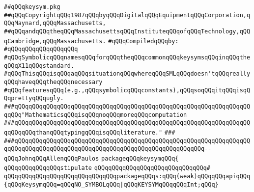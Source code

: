 \label{src/lib/x-kit/xclient/src/window/keysym.pkg}
\verb|##qQQqkeysym.pkg|\newline
\verb|##qQQqCopyrightqQQq1987qQQqbyqQQqDigitalqQQqEquipmentqQQqCorporation,qQQqMaynard,qQQqMassachusetts,|\newline
\verb|##qQQqandqQQqtheqQQqMassachusettsqQQqInstituteqQQqofqQQqTechnology,qQQqCambridge,qQQqMassachusetts.|\newline
\newline
\verb|#qQQqCompiledqQQqby:|\newline
\verb|#qQQqqQQqqQQqqQQqqQQq|\newline
\newline
\newline
\newline
\verb|#qQQqSymbolicqQQqnamesqQQqforqQQqtheqQQqcommonqQQqkeysymsqQQqinqQQqtheqQQqX11qQQqstandard.|\newline
\verb|#qQQqThisqQQqisqQQqaqQQqsituationqQQqwhereqQQqSMLqQQqdoesn'tqQQqreallyqQQqhaveqQQqtheqQQqnecessary|\newline
\verb|#qQQqfeaturesqQQq(e.g.,qQQqsymbolicqQQqconstants),qQQqsoqQQqitqQQqisqQQqprettyqQQqugly.|\newline
\newline
\newline
\newline
\verb|###qQQqqQQqqQQqqQQqqQQqqQQqqQQqqQQqqQQqqQQqqQQqqQQqqQQqqQQqqQQqqQQqqQQqqQQq"MathematicsqQQqisqQQqnoqQQqmoreqQQqcomputation|\newline
\verb|###qQQqqQQqqQQqqQQqqQQqqQQqqQQqqQQqqQQqqQQqqQQqqQQqqQQqqQQqqQQqqQQqqQQqqQQqqQQqthanqQQqtypingqQQqisqQQqliterature."|\newline
\verb|###|\newline
\verb|###qQQqqQQqqQQqqQQqqQQqqQQqqQQqqQQqqQQqqQQqqQQqqQQqqQQqqQQqqQQqqQQqqQQqqQQqqQQqqQQqqQQqqQQqqQQqqQQqqQQqqQQqqQQqqQQqqQQqqQQqqQQq--qQQqJohnqQQqAllenqQQqPaulos|\newline
\newline
\newline
\newline
\verb|packageqQQqkeysymqQQq{|\newline
\newline
\verb|qQQqqQQqqQQqqQQqstipulate|\newline
\verb|qQQqqQQqqQQqqQQqqQQqqQQqqQQqqQQq#|\newline
\verb|qQQqqQQqqQQqqQQqqQQqqQQqqQQqqQQqpackageqQQqs:qQQq(weak)qQQqqQQqapiqQQq{qQQqKeysymqQQq=qQQqNO_SYMBOLqQQq|\verb#|qQQqKEYSYMqQQqqQQqInt;qQQq}#\newline
